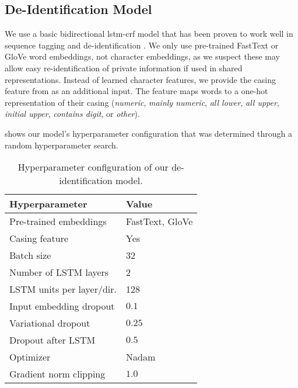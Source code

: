 \subsection{De-Identification Model}\label{sec:deidentification-model}
%
We use a basic bidirectional \ac{lstm}-\ac{crf} model that has been proven to work well in sequence tagging \citep{huang2015bidirectional,lample2016neural} and de-identification \citep{dernoncourt2017identification,liu2017identification}.
%
We only use pre-trained FastText \citep{bojanowski2016enriching} or GloVe \citep{pennington2014glove} word embeddings, not character embeddings, as we suspect these may allow easy re-identification of private information if used in shared representations.
%
Instead of learned character features, we provide the casing feature from \citet{reimers2017optimal} as an additional input.
%
The feature maps words to a one-hot representation of their casing (\textit{numeric}, \textit{mainly numeric}, \textit{all lower}, \textit{all upper}, \textit{initial upper}, \textit{contains digit}, or \textit{other}).

%
 shows our model's hyperparameter configuration that was determined through a random hyperparameter search.

\begin{table}
    \centering
    \begin{tabular}{ll}
     \toprule
     Hyperparameter & Value\\
     \midrule
     Pre-trained embeddings & FastText, GloVe\\
     Casing feature & Yes\\
     Batch size & 32\\
     Number of LSTM layers & 2\\
     LSTM units per layer/dir. & 128\\
     Input embedding dropout & $0.1$\\
     Variational dropout & $0.25$\\
     Dropout after LSTM & $0.5$\\
     Optimizer & Nadam\\
     Gradient norm clipping & $1.0$\\
     \bottomrule
    \end{tabular}
    \caption{Hyperparameter configuration of our de-identification model.}\label{tab:deid-hyperparameters}
\end{table}


